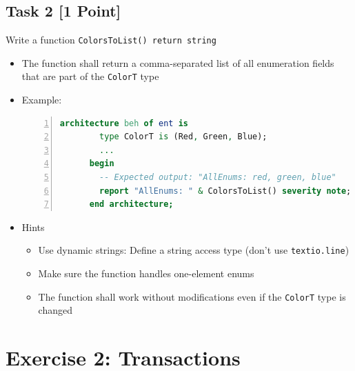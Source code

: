 \documentclass[12pt,epsf,makeidx,oneside]{book}
\begin{document}
\subsection{Task 2 [1 Point]}
   Write a function {\tt ColorsToList() return string}
  \begin{itemize}[noitemsep]
    \item The function shall return a comma-separated list of all enumeration fields that are part of the {\tt ColorT} type
    \item Example:
    \begin{lstlisting}[language=VHDL,gobble=4,numbers=left]
      architecture beh of ent is
        type ColorT is (Red, Green, Blue);
        ...
      begin
        -- Expected output: "AllEnums: red, green, blue"
        report "AllEnums: " & ColorsToList() severity note; 
      end architecture;
    \end{lstlisting}
    \item Hints
    \begin{itemize}[noitemsep]
      \item Use dynamic strings: Define a string access type (don't use {\tt textio.line})
      \item Make sure the function handles one-element enums
      \item The function shall work without modifications even if the {\tt ColorT} type is changed
    \end{itemize}
  \end{itemize}

\section{Exercise 2: Transactions}
\end{document}
